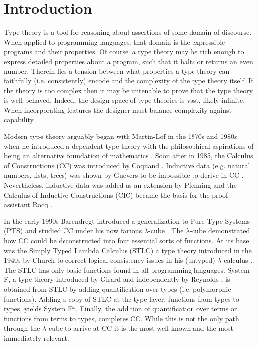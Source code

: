 \chapter{Introduction}



Type theory is a tool for reasoning about assertions of some domain of discourse.
When applied to programming languages, that domain is the expressible programs and their properties.
Of course, a type theory may be rich enough to express detailed properties about a program, such that it halts or returns an even number.
Therein lies a tension between what properties a type theory can faithfully (i.e. consistently) encode and the complexity of the type theory itself.
If the theory is too complex then it may be untenable to prove that the type theory is well-behaved.
Indeed, the design space of type theories is vast, likely infinite.
When incorporating features the designer must balance complexity against capability.

Modern type theory arguably began with Martin-L\"{o}f in the 1970s and 1980s when he introduced a dependent type theory with the philosophical aspirations of being an alternative foundation of mathematics \cite{lof1975,lof1984}.
Soon after in 1985, the Calculus of Constructions (CC) was introduced by Coquand \cite{coquand1985,coquand1986}.
Inductive data (e.g. natural numbers, lists, trees) was shown by Guevers to be impossible to derive in CC \cite{geuvers2001_noind}.
Nevertheless, inductive data was added as an extension by Pfenning \cite{pfenning1989} and the Calculus of Inductive Constructions (CIC) became the basis for the proof assistant Rocq \cite{paulin-mohring1993}.

In the early 1990s Barendregt introduced a generalization to Pure Type Systems (PTS) and studied CC under his now famous $\lambda$-cube \cite{barendregt1990_cube,barendregt1991_pts}.
The $\lambda$-cube demonstrated how CC could be deconstructed into four essential sorts of functions.
At its base was the Simply Typed Lambda Calculus (STLC) a type theory introduced in the 1940s by Church to correct logical consistency issues in his (untyped) $\lambda$-calculus \cite{church1940_stlc}.
The STLC has only basic functions found in all programming languages.
System F, a type theory introduced by Girard \cite{girard1972,girard1989} and independently by Reynolds \cite{reynolds1974_systemf}, is obtained from STLC by adding quantification over types (i.e. polymorphic functions).
Adding a copy of STLC at the type-layer, functions from types to types, yields System F$^\omega$.
Finally, the addition of quantification over terms or functions from terms to types, completes CC.
While this is not the only path through the $\lambda$-cube to arrive at CC it is the most well-known and the most immediately relevant.

